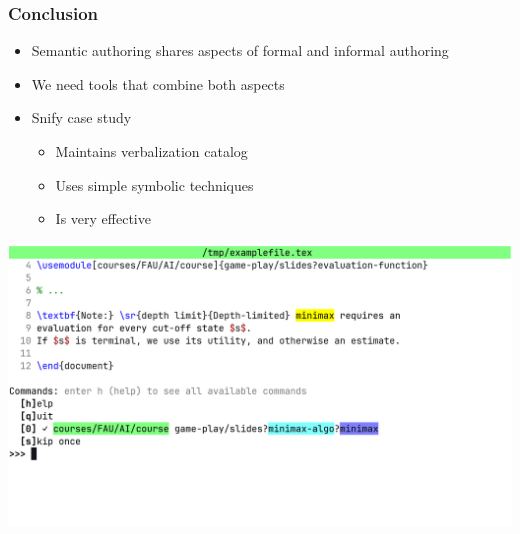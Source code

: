 \documentclass[aspectratio=169]{beamer}
\begin{document}
\begin{frame}
    \frametitle{Conclusion}
    \begin{itemize}
        \item Semantic authoring shares aspects of formal and informal authoring
        \item We need tools that combine both aspects
        \item Snify case study
            \begin{itemize}
                \item Maintains verbalization catalog
                \item Uses simple symbolic techniques
                \item Is very effective
            \end{itemize}
    \end{itemize}
    \centering
    \vspace{1em}\par
    \includegraphics[scale=0.15]{screenshot.png}
\end{frame}

\appendix

\end{document}
